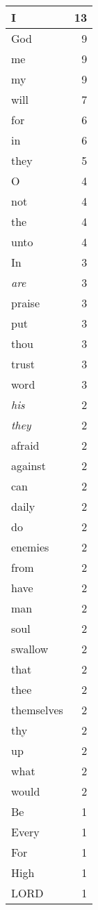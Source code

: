\begin{center}
\begin{longtable}{l|r}
\hline \hline
\endlastfoot
I & 13 \\ \hline
God & 9 \\ \hline
me & 9 \\ \hline
my & 9 \\ \hline
will & 7 \\ \hline
for & 6 \\ \hline
in & 6 \\ \hline
they & 5 \\ \hline
O & 4 \\ \hline
not & 4 \\ \hline
the & 4 \\ \hline
unto & 4 \\ \hline
In & 3 \\ \hline
\emph{are} & 3 \\ \hline
praise & 3 \\ \hline
put & 3 \\ \hline
thou & 3 \\ \hline
trust & 3 \\ \hline
word & 3 \\ \hline
\emph{his} & 2 \\ \hline
\emph{they} & 2 \\ \hline
afraid & 2 \\ \hline
against & 2 \\ \hline
can & 2 \\ \hline
daily & 2 \\ \hline
do & 2 \\ \hline
enemies & 2 \\ \hline
from & 2 \\ \hline
have & 2 \\ \hline
man & 2 \\ \hline
soul & 2 \\ \hline
swallow & 2 \\ \hline
that & 2 \\ \hline
thee & 2 \\ \hline
themselves & 2 \\ \hline
thy & 2 \\ \hline
up & 2 \\ \hline
what & 2 \\ \hline
would & 2 \\ \hline
Be & 1 \\ \hline
Every & 1 \\ \hline
For & 1 \\ \hline
High & 1 \\ \hline
LORD & 1 \\ \hline

\end{longtable}
\end{center}
